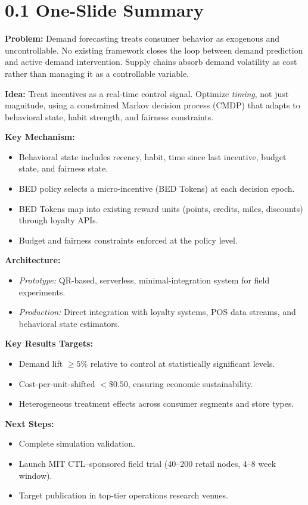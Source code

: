 \section*{0.1 One-Slide Summary}

\textbf{Problem:}  
Demand forecasting treats consumer behavior as exogenous and uncontrollable.  
No existing framework closes the loop between demand prediction and active demand intervention.  
Supply chains absorb demand volatility as cost rather than managing it as a controllable variable.

\textbf{Idea:}  
Treat incentives as a real-time control signal.  
Optimize \emph{timing}, not just magnitude, using a constrained Markov decision process (CMDP) that adapts to behavioral state, habit strength, and fairness constraints.

\textbf{Key Mechanism:}
\begin{itemize}
  \item Behavioral state includes recency, habit, time since last incentive, budget state, and fairness state.
  \item BED policy selects a micro-incentive (BED Tokens) at each decision epoch.
  \item BED Tokens map into existing reward units (points, credits, miles, discounts) through loyalty APIs.
  \item Budget and fairness constraints enforced at the policy level.
\end{itemize}

\textbf{Architecture:}
\begin{itemize}
  \item \emph{Prototype:} QR-based, serverless, minimal-integration system for field experiments.
  \item \emph{Production:} Direct integration with loyalty systems, POS data streams, and behavioral state estimators.
\end{itemize}

\textbf{Key Results Targets:}
\begin{itemize}
  \item Demand lift $\geq 5\%$ relative to control at statistically significant levels.
  \item Cost-per-unit-shifted $<\$0.50$, ensuring economic sustainability.
  \item Heterogeneous treatment effects across consumer segments and store types.
\end{itemize}

\textbf{Next Steps:}
\begin{itemize}
  \item Complete simulation validation.
  \item Launch MIT CTL–sponsored field trial (40–200 retail nodes, 4–8 week window).
  \item Target publication in top-tier operations research venues.
\end{itemize}
